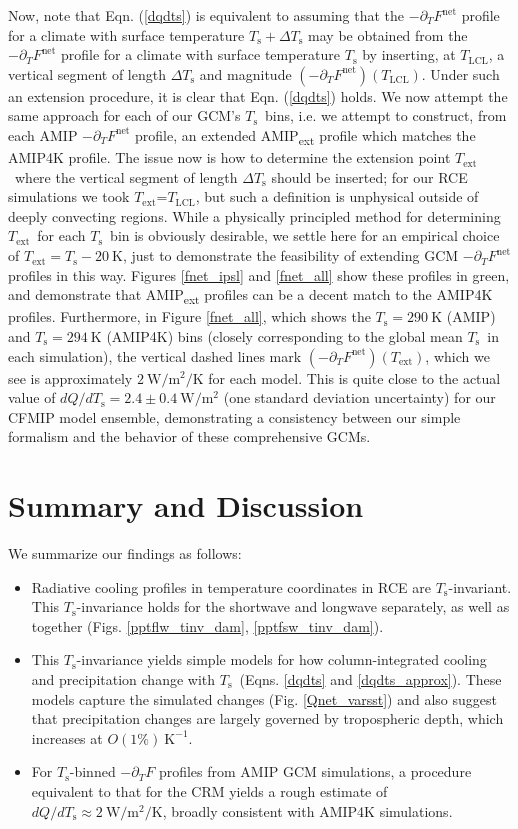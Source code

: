 \documentclass[9pt,twocolumn,twoside,lineno]{pnas-new}
\newcommand{\eqnref}[1]{(\ref{#1})}
\newcommand{\ppt}{\ensuremath{\partial_T}}
\newcommand{\Fnet}{\ensuremath{F^\mathrm{net}}}
\newcommand{\Wmsq}{\ensuremath{\mathrm{W/m^2}}}
\newcommand{\WmsqK}{\ensuremath{\mathrm{W/m^2/K}}}
\newcommand{\Kinverse}{\ensuremath{\mathrm{K^{-1}}}}
\newcommand{\Kelvin}{\ensuremath{\mathrm{K}}}
\newcommand{\Ts}{\ensuremath{T_\mathrm{s}}}
\newcommand{\Tlcl}{\ensuremath{T_\mathrm{LCL}}}
\newcommand{\Text}{\ensuremath{T_\mathrm{ext}}}
\begin{document}
Now, note that Eqn. \eqnref{dqdts} is equivalent to assuming that the $-\ppt \Fnet$ profile for  a climate with surface temperature $\Ts + \Delta \Ts$ may be obtained from the $-\ppt \Fnet$ profile for  a climate with surface temperature $\Ts$  by inserting, at \Tlcl, a vertical segment of length $\Delta \Ts$ and magnitude $(-\ppt \Fnet)(\Tlcl)$. Under such an extension procedure, it is clear that Eqn. \eqnref{dqdts} holds. We now attempt the same approach for each of our GCM's \Ts\ bins, i.e. we attempt to construct, from each AMIP $-\ppt \Fnet$ profile, an extended AMIP\textsubscript{ext} profile which matches the AMIP4K profile. The issue now is how to determine the extension point \Text\  where the vertical segment of length $\Delta \Ts$ should be inserted; for our RCE simulations we took \Text =\Tlcl, but such a definition is unphysical outside of deeply convecting regions. While a physically principled method  for determining \Text\ for each  \Ts\ bin is obviously desirable, we settle here for an empirical choice of $\Text = \Ts - 20\ \Kelvin$, just to demonstrate the feasibility of extending GCM $-\ppt\Fnet$ profiles in this way. Figures \ref{fnet_ipsl} and \ref{fnet_all} show these profiles in green, and demonstrate that AMIP\textsubscript{ext} profiles can be a decent match to the AMIP4K profiles. Furthermore, in Figure \ref{fnet_all}, which shows the $\Ts=290\ \Kelvin$ (AMIP) and $\Ts=294 \ \Kelvin$ (AMIP4K) bins (closely corresponding to the global mean \Ts\ in each simulation), the vertical dashed lines mark $(-\ppt\Fnet)(\Text)$, which we see is approximately $2 \ \WmsqK$ for each model. This is quite close to the actual value of $dQ/d\Ts = 2.4 \pm 0.4\ \Wmsq$ (one standard deviation uncertainty) for our CFMIP model ensemble, demonstrating a consistency between our simple formalism and the behavior of these comprehensive GCMs.



\section{Summary and Discussion}
\label{sec_summary}
We summarize our findings as follows:
	\begin{itemize}
		\item Radiative cooling profiles in temperature coordinates in RCE are  \Ts-invariant. This \Ts-invariance holds for the shortwave and longwave separately, as well as together (Figs. \ref{pptflw_tinv_dam}, \ref{pptfsw_tinv_dam}).
		\item This \Ts-invariance yields simple models for how column-integrated cooling and  precipitation change with \Ts\ (Eqns. \ref{dqdts} and \ref{dqdts_approx}). These models capture the simulated changes (Fig. \ref{Qnet_varsst}) and also suggest  that precipitation changes are largely governed by tropospheric depth, which increases at $O(1\%)\ \Kinverse$.
		\item For \Ts-binned $-\ppt F$ profiles from AMIP GCM simulations, a procedure equivalent to that for the CRM yields a rough estimate of $dQ/d\Ts \approx 2\ \WmsqK$, broadly consistent with  AMIP4K simulations.
	\end{itemize}
		
\end{document}
